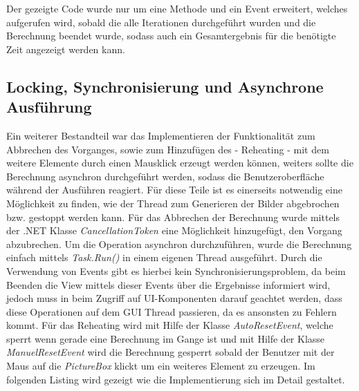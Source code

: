 \documentclass[a4paper,ngerman]{scrartcl}
\begin{document}
Der gezeigte Code wurde nur um eine Methode und ein Event erweitert, welches aufgerufen wird, sobald die alle Iterationen durchgeführt wurden und die Berechnung beendet wurde, sodass auch ein Gesamtergebnis für die benötigte Zeit angezeigt werden kann.

\subsection{Locking, Synchronisierung und Asynchrone Ausführung}

Ein weiterer Bestandteil war das Implementieren der Funktionalität zum Abbrechen des Vorganges, sowie zum Hinzufügen des - Reheating - mit dem weitere Elemente durch einen Mausklick erzeugt werden können, weiters sollte die Berechnung asynchron durchgeführt werden, sodass die Benutzeroberfläche während der Ausführen reagiert. Für diese Teile ist es einerseits notwendig eine Möglichkeit zu finden, wie der Thread zum Generieren der Bilder abgebrochen bzw. gestoppt werden kann. Für das Abbrechen der Berechnung wurde mittels der .NET Klasse \textit{CancellationToken} eine Möglichkeit hinzugefügt, den Vorgang abzubrechen. Um die Operation asynchron durchzuführen, wurde die Berechnung einfach mittels \textit{Task.Run()} in einem eigenen Thread ausgeführt. Durch die Verwendung von Events gibt es hierbei kein Synchronisierungsproblem, da beim Beenden die View mittels dieser Events über die Ergebnisse informiert wird, jedoch muss in beim Zugriff auf UI-Komponenten darauf geachtet werden, dass diese Operationen auf dem GUI Thread passieren, da es ansonsten zu Fehlern kommt. Für das Reheating wird mit Hilfe der Klasse \textit{AutoResetEvent}, welche sperrt wenn gerade eine Berechnung im Gange ist und mit Hilfe der Klasse \textit{ManuelResetEvent} wird die Berechnung gesperrt sobald der Benutzer mit der Maus auf die \textit{PictureBox} klickt um ein weiteres Element zu erzeugen. Im folgenden Listing wird gezeigt wie die Implementierung sich im Detail gestaltet.
\end{document}
